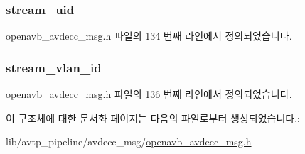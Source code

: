 \subsubsection[{\texorpdfstring{stream\+\_\+uid}{stream_uid}}]{ stream\+\_\+uid}\hypertarget{structopenavb_avdecc_msg_params___listener_stream_i_d__t_a511b2a26fe61b945ced1dd0bab9f2d1b}{}\label{structopenavb_avdecc_msg_params___listener_stream_i_d__t_a511b2a26fe61b945ced1dd0bab9f2d1b}


openavb\+\_\+avdecc\+\_\+msg.\+h 파일의 134 번째 라인에서 정의되었습니다.

\subsubsection[{\texorpdfstring{stream\+\_\+vlan\+\_\+id}{stream_vlan_id}}]{ stream\+\_\+vlan\+\_\+id}\hypertarget{structopenavb_avdecc_msg_params___listener_stream_i_d__t_a31db70d552fc6f5d35875430fca593e6}{}\label{structopenavb_avdecc_msg_params___listener_stream_i_d__t_a31db70d552fc6f5d35875430fca593e6}


openavb\+\_\+avdecc\+\_\+msg.\+h 파일의 136 번째 라인에서 정의되었습니다.



이 구조체에 대한 문서화 페이지는 다음의 파일로부터 생성되었습니다.\+:\begin{DoxyCompactItemize}
\item 
lib/avtp\+\_\+pipeline/avdecc\+\_\+msg/\hyperlink{openavb__avdecc__msg_8h}{openavb\+\_\+avdecc\+\_\+msg.\+h}\end{DoxyCompactItemize}
